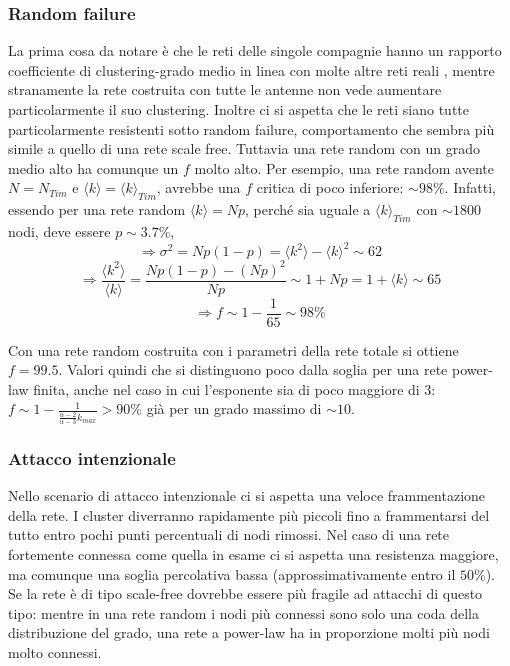 \subsubsection{Random failure}
La prima cosa da notare è che le reti delle singole compagnie hanno un rapporto coefficiente di clustering-grado medio in linea con molte altre reti reali \parencite{Barbalbert2002}, mentre stranamente la rete costruita con tutte le antenne non vede aumentare particolarmente il suo clustering. Inoltre ci si aspetta che le reti siano tutte particolarmente resistenti sotto random failure, comportamento che sembra più simile a quello di una rete scale free. Tuttavia una rete random con un grado medio alto ha comunque un $f$ molto alto. Per esempio, una rete random avente $N = N_{Tim}$ e $\langle k \rangle = \langle k \rangle_{Tim}$, avrebbe una $f$ critica di poco inferiore: $\sim 98\%$. Infatti, essendo per una rete random $\langle k \rangle = Np$, perché sia uguale a $\langle k \rangle_{Tim}$ con $\sim 1800$ nodi, deve essere $p \sim 3.7\%$, 
$$\Rightarrow \sigma^2 = Np(1-p) = \langle k^2 \rangle - \langle k \rangle^2 \sim 62$$
$$\Rightarrow \frac{\langle k^2 \rangle }{\langle k \rangle} = \frac{Np(1-p)-(Np)^2}{Np} \sim 1+Np = 1+ \langle k \rangle \sim 65$$
$$\Rightarrow f \sim 1 - \frac{1}{65} \sim 98\%$$

Con una rete random costruita con i parametri della rete totale si ottiene $f = 99.5$. Valori quindi che si distinguono poco dalla soglia per una rete power-law finita, anche nel caso in cui l'esponente sia di poco maggiore di 3: $f \sim 1 - \frac{1}{\frac{\alpha - 2}{\alpha-3}k_{max}} > 90\%$ già per un grado massimo di $\sim10$.


\subsubsection{Attacco intenzionale}
Nello scenario di attacco intenzionale ci si aspetta una veloce frammentazione della rete. I cluster diverranno rapidamente più piccoli fino a frammentarsi del tutto entro pochi punti percentuali di nodi rimossi. Nel caso di una rete fortemente connessa come quella in esame ci si aspetta una resistenza maggiore, ma comunque una soglia percolativa bassa (approssimativamente entro il $50\%$). Se la rete è di tipo scale-free dovrebbe essere più fragile ad attacchi di questo tipo: mentre in una rete random i nodi più connessi sono solo una coda della distribuzione del grado, una rete a power-law ha in proporzione molti più nodi molto connessi.

